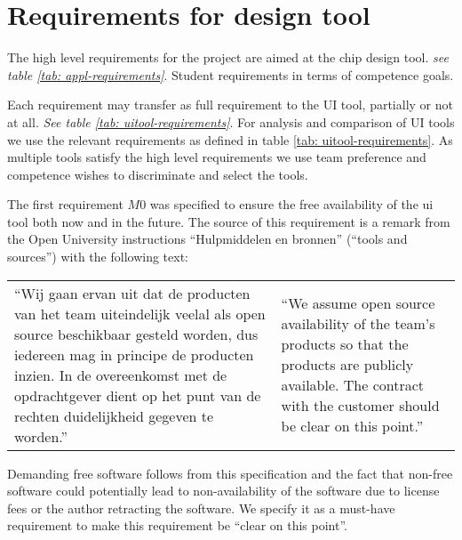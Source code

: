 \section{Requirements for design tool}

The high level requirements for the project are aimed at the chip design tool. {\em see table \ref{tab: appl-requirements}}.
Student requirements in terms of competence goals.

Each requirement may transfer as full requirement to the UI tool, partially or not at all. {\em See table \ref{tab: uitool-requirements}}.
For analysis and comparison of UI tools we use the relevant requirements as defined in table \ref{tab: uitool-requirements}.
As multiple tools satisfy the high level requirements we use team preference and competence wishes to discriminate and select the tools.

The first requirement $M0$ was specified to ensure the free availability of the ui tool both now and in the future. The source of
this requirement is a remark from the Open University instructions ``Hulpmiddelen en bronnen'' (``tools and sources'') with the following text:

\vspace{1em}

\begin{tabular}[t]{ll}
\begin{minipage}{.45\textwidth}
    ``Wij gaan ervan uit dat de producten van het team uiteindelijk veelal als open source beschikbaar gesteld worden,
    dus iedereen mag in principe de producten inzien. In de overeenkomst met de opdrachtgever dient op het punt van de rechten
    duidelijkheid gegeven te worden.''
\end{minipage}
&
\begin{minipage}{.45\textwidth}
    ``We assume open source availability of the team's products so that the products are publicly available.
    The contract with the customer should be clear on this point.''
\end{minipage}
\end{tabular}

\vspace{1em}

\noindent Demanding free software follows from this specification and the fact that non-free software could potentially lead to non-availability of
the software due to license fees or the author retracting the software. We specify it as a must-have requirement to make this requirement
be ``clear on this point''.

